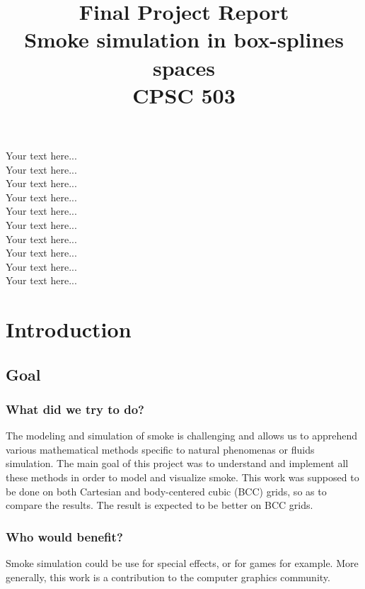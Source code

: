 \documentclass[accepted,single]{gipaper}
\title{Final Project Report \\
Smoke simulation in box-splines spaces\\
CPSC 503}
\affiliation{Department of Computer Science \\University of Calgary
\\\tt{ealtazin@cpsc.ucalgary.ca}}
\begin{document}
\begin{keywords}
Your text here...\\
Your text here...\\
Your text here...\\
Your text here...\\
Your text here...\\
Your text here...\\
Your text here...\\
Your text here...\\
Your text here...\\
Your text here...\\
\end{keywords}


\section{Introduction}

\subsection{Goal}

\subsubsection{What did we try to do?}

The modeling and simulation of smoke is challenging and allows us to apprehend various mathematical methods specific to natural phenomenas or fluids simulation. The main goal of this project was to understand and implement all these methods in order to model and visualize smoke. This work was supposed to be done on both Cartesian and body-centered cubic (BCC) grids, so as to compare the results. The result is expected to be better on BCC grids.

\subsubsection{Who would benefit?}

Smoke simulation could be use for special effects, or for games for example. More generally, this work is a contribution to the computer graphics community.
\end{document}
